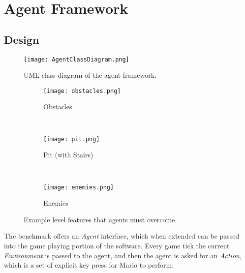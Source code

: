 
\section{Agent Framework}


\subsection{Design}
\label{subsec:agentdes}

\begin{figure}[t]
	\centering
	\texttt{[image: AgentClassDiagram.png]}
	\caption{UML class diagram of the agent framework.}
	\label{fig:aumlcd}
\end{figure}


\begin{figure}[t]
	\begin{adjustwidth}{-2cm}{-2cm}
    \centering
          \begin{subfigure}[b]{0.32\textwidth}
                  \centering
                  \texttt{[image: obstacles.png]}
                  \caption{Obstacles}
          \end{subfigure}~
          \begin{subfigure}[b]{0.32\textwidth}
                  \centering
                  \texttt{[image: pit.png]}
                  \caption{Pit (with Stairs)}
          \end{subfigure}~
          \begin{subfigure}[b]{0.32\textwidth}
                  \centering
                  \texttt{[image: enemies.png]}
                  \caption{Enemies}
          \end{subfigure}
	\caption{Example level features that agents must overcome.}\label{fig:lpelements}
    \end{adjustwidth}
\end{figure}

The benchmark offers an \emph{Agent} interface, which when extended can be passed into the game playing portion of the software. Every game tick the current \emph{Environment} is passed to the agent, and then the agent is asked for an \emph{Action}, which is a set of explicit key press for Mario to perform.

